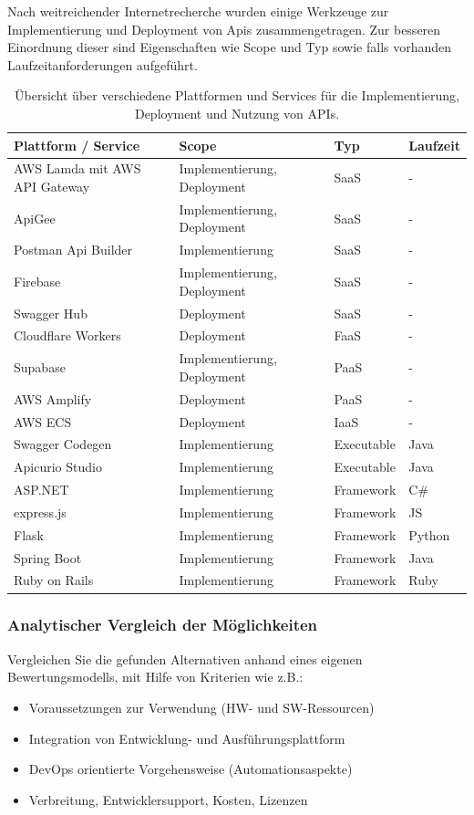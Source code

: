 \documentclass[notitlepage, hidelinks]{article}
\begin{document}
Nach weitreichender Internetrecherche wurden einige Werkzeuge zur Implementierung und Deployment von Apis zusammengetragen. Zur besseren Einordnung dieser sind Eigenschaften wie Scope und Typ sowie falls vorhanden Laufzeitanforderungen aufgeführt. 

\begin{table}[h]
\centering
\begin{tabular}{|L{4cm}|L{3cm}|L{2cm}|L{2cm}|}
\hline
\textbf{Plattform / Service} & \textbf{Scope} & \textbf{Typ} & \textbf{Laufzeit} \\ \hline
AWS Lamda mit AWS API Gateway & Implementierung, Deployment & SaaS & - \\ \hline
ApiGee & Implementierung, Deployment & SaaS & - \\ \hline
Postman Api Builder & Implementierung & SaaS & - \\ \hline
Firebase & Implementierung, Deployment & SaaS & - \\ \hline
Swagger Hub & Deployment & SaaS & - \\ \hline
Cloudflare Workers & Deployment & FaaS & - \\ \hline
Supabase & Implementierung, Deployment & PaaS & - \\ \hline
AWS Amplify & Deployment & PaaS & - \\ \hline
AWS ECS & Deployment & IaaS & - \\ \hline
Swagger Codegen & Implementierung & Executable & Java \\ \hline
Apicurio Studio & Implementierung & Executable & Java \\ \hline
ASP.NET & Implementierung & Framework & C\# \\ \hline
express.js & Implementierung & Framework & JS \\ \hline
Flask & Implementierung & Framework & Python \\ \hline
Spring Boot & Implementierung & Framework & Java \\ \hline
Ruby on Rails & Implementierung & Framework & Ruby \\ \hline
\end{tabular}
\caption{Übersicht über verschiedene Plattformen und Services für die Implementierung, Deployment und Nutzung von APIs.}
\label{api-platforms}
\end{table}


\subsubsection{Analytischer Vergleich der Möglichkeiten}
Vergleichen Sie die gefunden Alternativen anhand eines eigenen Bewertungsmodells, mit Hilfe von Kriterien wie z.B.:
\begin{itemize}
\item Voraussetzungen zur Verwendung (HW- und SW-Ressourcen)
\item Integration von Entwicklung- und Ausführungsplattform
\item DevOps orientierte Vorgehensweise (Automationsaspekte)
\item Verbreitung, Entwicklersupport, Kosten, Lizenzen
\end{itemize}
\end{document}
